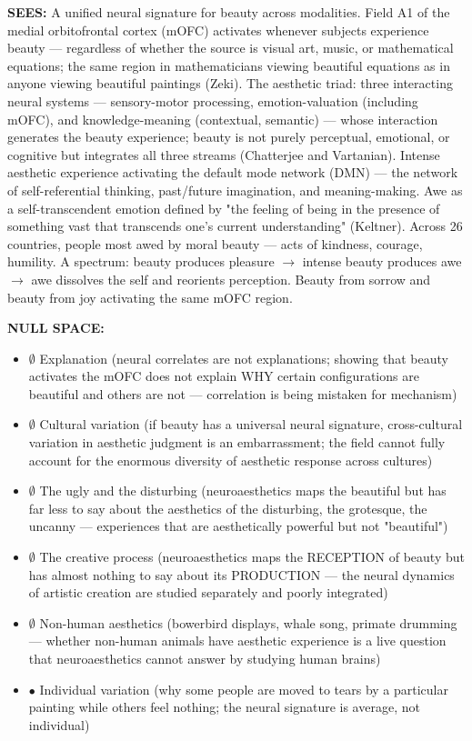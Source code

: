 \textbf{SEES:} A unified neural signature for beauty across modalities. Field A1 of the medial orbitofrontal cortex (mOFC) activates whenever subjects experience beauty — regardless of whether the source is visual art, music, or mathematical equations; the same region in mathematicians viewing beautiful equations as in anyone viewing beautiful paintings (Zeki). The aesthetic triad: three interacting neural systems — sensory-motor processing, emotion-valuation (including mOFC), and knowledge-meaning (contextual, semantic) — whose interaction generates the beauty experience; beauty is not purely perceptual, emotional, or cognitive but integrates all three streams (Chatterjee and Vartanian). Intense aesthetic experience activating the default mode network (DMN) — the network of self-referential thinking, past/future imagination, and meaning-making. Awe as a self-transcendent emotion defined by "the feeling of being in the presence of something vast that transcends one's current understanding" (Keltner). Across 26 countries, people most awed by moral beauty — acts of kindness, courage, humility. A spectrum: beauty produces pleasure $\rightarrow$ intense beauty produces awe $\rightarrow$ awe dissolves the self and reorients perception. Beauty from sorrow and beauty from joy activating the same mOFC region.


\textbf{NULL SPACE:}

\begin{itemize}[nosep,leftmargin=*]
  \item $\emptyset$ Explanation (neural correlates are not explanations; showing that beauty activates the mOFC does not explain WHY certain configurations are beautiful and others are not — correlation is being mistaken for mechanism)
  \item $\emptyset$ Cultural variation (if beauty has a universal neural signature, cross-cultural variation in aesthetic judgment is an embarrassment; the field cannot fully account for the enormous diversity of aesthetic response across cultures)
  \item $\emptyset$ The ugly and the disturbing (neuroaesthetics maps the beautiful but has far less to say about the aesthetics of the disturbing, the grotesque, the uncanny — experiences that are aesthetically powerful but not "beautiful")
  \item $\emptyset$ The creative process (neuroaesthetics maps the RECEPTION of beauty but has almost nothing to say about its PRODUCTION — the neural dynamics of artistic creation are studied separately and poorly integrated)
  \item $\emptyset$ Non-human aesthetics (bowerbird displays, whale song, primate drumming — whether non-human animals have aesthetic experience is a live question that neuroaesthetics cannot answer by studying human brains)
  \item $\bullet$ Individual variation (why some people are moved to tears by a particular painting while others feel nothing; the neural signature is average, not individual)
\end{itemize}


